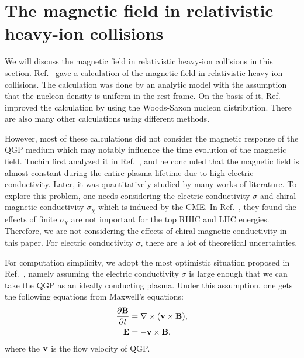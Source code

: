 \documentclass[preprint]{elsarticle}
\begin{document}
\section{The magnetic field in relativistic heavy-ion collisions}\label{eBinHIC}
We will discuss the magnetic field in relativistic heavy-ion collisions in this section. Ref.~\cite{Kharzeev:2007jp} gave a calculation of the magnetic field in relativistic heavy-ion collisions. The calculation was done by an analytic model with the assumption that the nucleon density is uniform in the rest frame. On the basis of it, Ref.~\cite{Mo:2013qya} improved the calculation by using the Woods-Saxon nucleon distribution. There are also many other calculations using different methods\cite{Skokov:2009qp,Voronyuk:2011jd,Bzdak:2011yy,Deng:2012pc,Tuchin:2013apa}.

However, most of these calculations did not consider the magnetic response of the QGP medium which may notably influence the time evolution of the magnetic field. Tuchin first analyzed it in Ref.~\cite{Tuchin:2010vs,Tuchin:2010vs2}, and he concluded that the magnetic field is almost constant during the entire plasma lifetime due to high electric conductivity.
Later, it was quantitatively studied by many works of literature\cite{Deng:2012pc,Tuchin:2013apa,McLerran:2013hla,Tuchin:2013ie,Zakharov:2014dia,Tuchin:2014iua,Tuchin:2015oka}. To explore this problem, one needs considering the electric conductivity $\sigma$ and chiral magnetic conductivity $\sigma_\chi$ which is induced by the CME.  In Ref.~\cite{McLerran:2013hla}, they found the effects of finite $\sigma_\chi$ are not important for the top RHIC and LHC energies. Therefore, we are not considering the effects of chiral magnetic conductivity in this paper. For electric conductivity $\sigma$, there are a lot of theoretical uncertainties\cite{Arnold:2003zc, Gupta:2003zh, Ding:2010ga, Francis:2011bt}.

For computation simplicity, we adopt the most optimistic situation proposed in Ref.~\cite{Deng:2012pc}, namely assuming the electric conductivity $\sigma$ is large enough that we can take the QGP as an ideally conducting plasma. Under this assumption, one gets the following equations from Maxwell's equations:
\begin{align}
\frac{\partial \vb{B}}{\partial t} &= \nabla \times (\vb{v} \times \vb{B}),\label{eq:pBpt}  \\
\vb{E} &= - \vb{v} \times \vb{B}, \label{eq:E}
\end{align}
where the $\vb{v}$ is the flow velocity of QGP.
\end{document}
